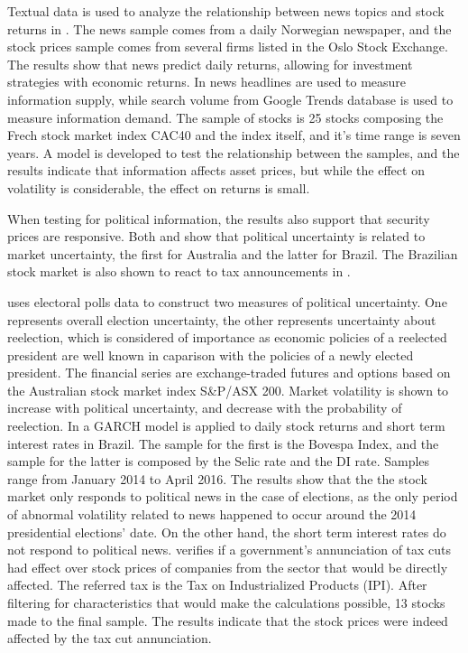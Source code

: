 \documentclass[cic,tc, english]{iiufrgs}
\begin{document}
    Textual data is used to analyze the relationship between news topics and stock returns in \citet{larsenthorsrud2017}. The news sample comes from a daily Norwegian newspaper, and the stock prices sample comes from several firms listed in the Oslo Stock Exchange. The results show that news predict daily returns, allowing for investment strategies with economic returns.
    In \citet{moussaetal2017} news headlines are used to measure information supply, while search volume from Google Trends database is used to measure information demand. The sample of stocks is 25 stocks composing the Frech stock market index CAC40 and the index itself, and it's time range is seven years. A model is developed to test the relationship between the samples, and the results indicate that information affects asset prices, but while the effect on volatility is considerable, the effect on returns is small.

    When testing for political information, the results also support that security prices are responsive. Both \citet{smales2015} and \citet{marquessantos2016} show that political uncertainty is related to market uncertainty, the first for Australia and the latter for Brazil. The Brazilian stock market is also shown to react to tax announcements in \citet{gabrielribeiro2013}.

    \citet{smales2015} uses electoral polls data to construct two measures of political uncertainty. One represents overall election uncertainty, the other represents uncertainty about reelection, which is considered of importance as economic policies of a reelected president are well known in caparison with the policies of a newly elected president. The financial series are exchange-traded futures and options based on the Australian stock market index S\&P/ASX 200. Market volatility is shown to increase with political uncertainty, and decrease with the probability of reelection.
    In \citet{marquessantos2016} a GARCH model is applied to daily stock returns and short term interest rates in Brazil. The sample for the first is the Bovespa Index, and the sample for the latter is composed by the Selic rate and the DI rate. Samples range from January 2014 to April 2016. The results show that the the stock market only responds to political news in the case of elections, as the only period of abnormal volatility related to news happened to occur around the 2014 presidential elections' date. On the other hand, the short term interest rates do not respond to political news.
    \citet{gabrielribeiro2013} verifies if a government's annunciation of tax cuts had effect over stock prices of companies from the sector that would be directly affected. The referred tax is the Tax on Industrialized Products (IPI). After filtering for characteristics that would make the calculations possible, 13 stocks made to the final sample. The results indicate that the stock prices were indeed affected by the tax cut annunciation.
\end{document}
